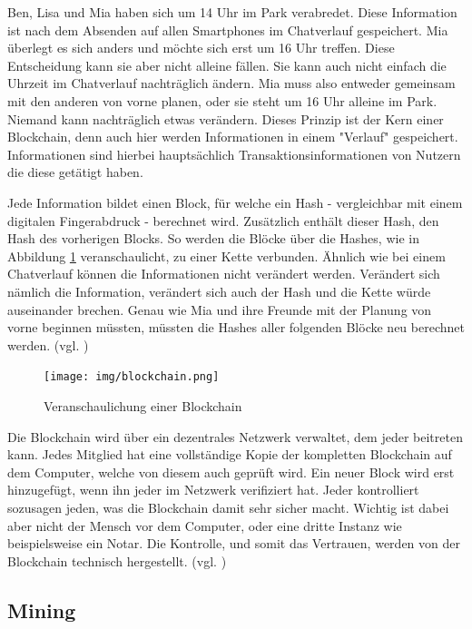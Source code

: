 \documentclass[oneside]{ausarbeitung}
\begin{document}
Ben, Lisa und Mia haben sich um 14 Uhr im Park verabredet. Diese
Information ist nach dem Absenden auf allen Smartphones im Chatverlauf
gespeichert. Mia überlegt es sich anders und möchte sich erst um 16
Uhr treffen. Diese Entscheidung kann sie aber nicht alleine fällen.
Sie kann auch nicht einfach die Uhrzeit im Chatverlauf nachträglich
ändern. Mia muss also entweder gemeinsam mit den anderen von vorne
planen, oder sie steht um 16 Uhr alleine im Park. Niemand kann
nachträglich etwas verändern. Dieses Prinzip ist der Kern einer
Blockchain, denn auch hier werden Informationen in einem "Verlauf"
gespeichert. Informationen sind hierbei hauptsächlich
Transaktionsinformationen von Nutzern die diese getätigt haben.

Jede Information bildet einen Block, für welche ein Hash -
vergleichbar mit einem digitalen Fingerabdruck - berechnet wird.
Zusätzlich enthält dieser Hash, den Hash des vorherigen Blocks. So
werden die Blöcke über die Hashes, wie in Abbildung \ref{fig:4}
veranschaulicht, zu einer Kette verbunden. Ähnlich wie bei einem
Chatverlauf können die Informationen nicht verändert werden.
Verändert sich nämlich die Information, verändert sich auch der
Hash und die Kette würde auseinander brechen. Genau wie Mia und ihre
Freunde mit der Planung von vorne beginnen müssten, müssten die
Hashes aller folgenden Blöcke neu berechnet werden. (vgl.
\cite{blockchain})

\begin{figure}[H]
  \centering
  \texttt{[image: img/blockchain.png]}
  \caption{Veranschaulichung einer Blockchain\cite{blockchain}}
  \label{fig:4}
\end{figure} 

Die Blockchain wird über ein dezentrales Netzwerk verwaltet, dem
jeder beitreten kann. Jedes Mitglied hat eine vollständige Kopie der
kompletten Blockchain auf dem Computer, welche von diesem auch
geprüft wird. Ein neuer Block wird erst hinzugefügt, wenn ihn jeder
im Netzwerk verifiziert hat. Jeder kontrolliert sozusagen jeden, was
die Blockchain damit sehr sicher macht. Wichtig ist dabei aber nicht
der Mensch vor dem Computer, oder eine dritte Instanz wie
beispielsweise ein Notar. Die Kontrolle, und somit das Vertrauen,
werden von der Blockchain technisch hergestellt. (vgl.
\cite{blockchain})

\subsection{Mining}
\label{sub:mining}
\end{document}
